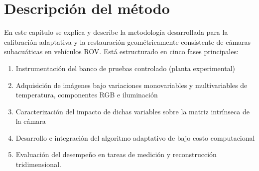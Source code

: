 \documentclass[12pt,letterpaper,spanish,twoside,openright]{report}
\begin{document}
\section{Descripción del método}

En este capítulo se explica y describe la metodología desarrollada para la calibración adaptativa y la restauración geométricamente consistente de cámaras subacuáticas en vehículos ROV. Está estructurado en cinco fases principales: 
\begin{enumerate}
  \item Instrumentación del banco de pruebas controlado (planta experimental)
  \item Adquisición de imágenes bajo variaciones monovariables y multivariables de temperatura, componentes RGB e iluminación
  \item Caracterización del impacto de dichas variables sobre la matriz intrínseca de la cámara
  \item Desarrollo e integración del algoritmo adaptativo de bajo costo computacional
  \item Evaluación del desempeño en tareas de medición y reconstrucción tridimensional.
\end{enumerate}
\end{document}
